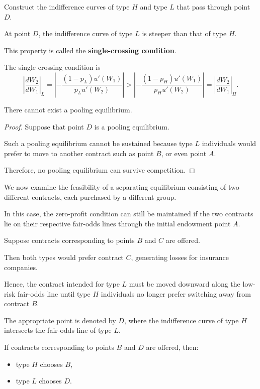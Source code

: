 Construct the indifference curves of type \(H\) and type \(L\) that pass through point \(D\).

At point \(D\), the indifference curve of type \(L\) is steeper than that of type \(H\).

This property is called the \textbf{single-crossing condition}.




The single-crossing condition is
\[
\left|
\frac{dW_2}{dW_1}
\right|_{L}
=
\left|
-
\frac{(1-p_L)u'(W_1)}{p_Lu'(W_2)}
\right|
>
\left|
-
\frac{(1-p_H)u'(W_1)}{p_Hu'(W_2)}
\right|
=
\left|
\frac{dW_2}{dW_1}
\right|_{H}.
\]

\begin{theorem}
There cannot exist a pooling equilibrium.
\end{theorem}

\begin{proof}
Suppose that point \(D\) is a pooling equilibrium.

Such a pooling equilibrium cannot be sustained because type \(L\) individuals would prefer to move to another contract such as point \(B\), or even point \(A\).

Therefore, no pooling equilibrium can survive competition.
\end{proof}

We now examine the feasibility of a separating equilibrium consisting of two different contracts, each purchased by a different group.

In this case, the zero-profit condition can still be maintained if the two contracts lie on their respective fair-odds lines through the initial endowment point \(A\).

Suppose contracts corresponding to points \(B\) and \(C\) are offered.

Then both types would prefer contract \(C\), generating losses for insurance companies.

Hence, the contract intended for type \(L\) must be moved downward along the low-risk fair-odds line until type \(H\) individuals no longer prefer switching away from contract \(B\).

The appropriate point is denoted by \(D\), where the indifference curve of type \(H\) intersects the fair-odds line of type \(L\).

If contracts corresponding to points \(B\) and \(D\) are offered, then:

\begin{itemize}
    \item type \(H\) chooses \(B\),
    \item type \(L\) chooses \(D\).
\end{itemize}

